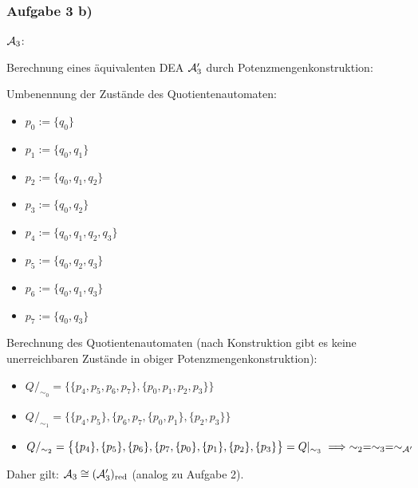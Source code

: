 \subsubsection{Aufgabe 3 b)}
$\mathcal{A}_3$:\\
\usetikzlibrary{positioning,automata}

Berechnung eines äquivalenten DEA $\mathcal{A}_3'$ durch Potenzmengenkonstruktion:

Umbenennung der Zustände des Quotientenautomaten:
\begin{itemize}
	\item $p_0:=\lbrace q_0\rbrace$
	\item $p_1:=\lbrace q_0,q_1\rbrace$
	\item $p_2:=\lbrace q_0,q_1,q_2\rbrace$
	\item $p_3:=\lbrace q_0,q_2\rbrace$
	\item $p_4:=\lbrace q_0,q_1,q_2,q_3\rbrace$
	\item $p_5:=\lbrace q_0,q_2,q_3\rbrace$
	\item $p_6:=\lbrace q_0,q_1,q_3\rbrace$
	\item $p_7:=\lbrace q_0,q_3\rbrace$
\end{itemize}

Berechnung des Quotientenautomaten (nach Konstruktion gibt es keine unerreichbaren Zustände in obiger Potenzmengenkonstruktion):
\begin{itemize}
	\item $Q/_{\sim_0}=\big\lbrace\lbrace p_4,p_5,p_6,p_7\rbrace,\lbrace p_0,p_1,p_2,p_3\rbrace\big\rbrace$
	\item $Q/_{\sim_1}=\big\lbrace\lbrace p_4,p_5\rbrace,\lbrace p_6,p_7,\lbrace p_0,p_1\rbrace,\lbrace p_2,p_3\rbrace\big\rbrace$
	\item $Q/_{\sim_2}=\big\lbrace\lbrace p_4\rbrace,\lbrace p_5\rbrace,\lbrace p_6\rbrace,\lbrace p_7,\lbrace p_0\rbrace,\lbrace p_1\rbrace,\lbrace p_2\rbrace,\lbrace p_3\rbrace\big\rbrace=Q|_{\sim_3}\implies\sim_2=\sim_3=\sim_{\mathcal{A}'}$
\end{itemize}
Daher gilt: $\mathcal{A}_3\cong(\mathcal{A}_3')_{\text{red}}$ (analog zu Aufgabe 2).

